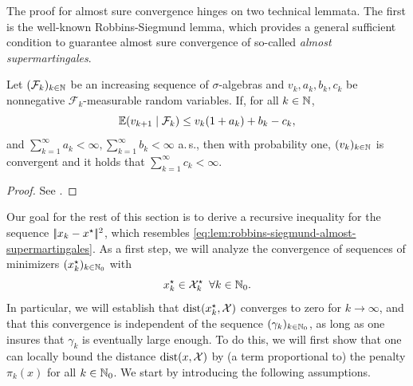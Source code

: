The proof for almost sure convergence hinges on two technical lemmata. The first is the well-known
Robbins-Siegmund lemma, which provides a general sufficient condition to guarantee almost sure
convergence of so-called \textit{almost supermartingales}.
\begin{lemma}
    \label{lem:robbins-siegmund}
    Let $(\mathcal{F}_k)_{k\in\mathbb{N}}$ be an increasing sequence of $\sigma$-algebras and $v_k, a_k,
    b_k, c_k$ be nonnegative $\mathcal{F}_k$-measurable random variables. If, for all $k\in\mathbb{N}$,
    \begin{equation}
        \label{eq:lem:robbins-siegmund-almost-supermartingales}
        \mathbb{E}(v_{k+1} \mid \mathcal{F}_k) \leq v_k(1+a_k) + b_k - c_k,        
    \end{equation}
    and $\sum_{k=1}^\infty a_k < \infty, \sum_{k=1}^\infty b_k < \infty$ a.\,s., then with probability
    one, $(v_k)_{k\in\mathbb{N}}$ is convergent and it holds that $\sum_{k=1}^\infty c_k < \infty$.
\end{lemma}
\begin{proof}
    See \cite{robbins1971convergence}.
\end{proof}
Our goal for the rest of this section is to derive a recursive inequality for the
sequence $|\!|x_k - x^\star|\!|^2$, which resembles \eqref{eq:lem:robbins-siegmund-almost-supermartingales}.
As a first step, we will analyze the convergence of sequences of minimizers $(x_k^\star)_{k\in\mathbb{N}_0}$ with
\[
    x_k^\star \in \mathcal{X}_k^\star \enspace\forall k\in\mathbb{N}_0.
\]
In particular, we will establish that $\operatorname{dist}(x_k^\star, \mathcal{X})$ converges
to zero for $k\to\infty$, and that this convergence is independent of the sequence
$(\gamma_k)_{k\in\mathbb{N}_0}$, as long as one insures that $\gamma_k$
is eventually large enough.
To do this, we will first show that one can locally bound the distance $\operatorname{dist}(x,\mathcal{X})$
by (a term proportional to) the penalty $\pi_k(x)$ for all $k\in\mathbb{N}_0$.
We start by introducing the following assumptions.
